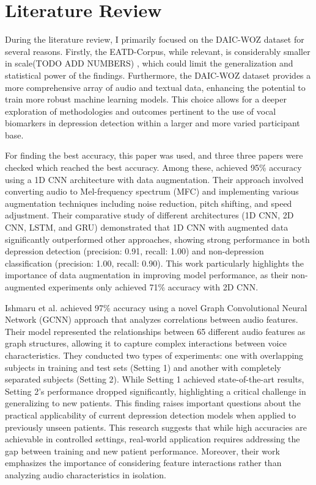 \section{Literature Review}
During the literature review, I primarily focused on the DAIC-WOZ dataset for several reasons. Firstly, the EATD-Corpus, while relevant, is considerably smaller in scale(TODO ADD NUMBERS) , which could limit the generalization and statistical power of the findings. Furthermore, the DAIC-WOZ dataset provides a more comprehensive array of audio and textual data, enhancing the potential to train more robust machine learning models. This choice allows for a deeper exploration of methodologies and outcomes pertinent to the use of vocal biomarkers in depression detection within a larger and more varied participant base.

For finding the best accuracy, this paper\cite{liu2024diagnostic} was used, and three three papers were checked which reached the best accuracy. Among these, \cite{homsiang2022classification} achieved 95\% accuracy using a 1D CNN architecture with data augmentation. Their approach involved converting audio to Mel-frequency spectrum (MFC) and implementing various augmentation techniques including noise reduction, pitch shifting, and speed adjustment. Their comparative study of different architectures (1D CNN, 2D CNN, LSTM, and GRU) demonstrated that 1D CNN with augmented data significantly outperformed other approaches, showing strong performance in both depression detection (precision: 0.91, recall: 1.00) and non-depression classification (precision: 1.00, recall: 0.90). This work particularly highlights the importance of data augmentation in improving model performance, as their non-augmented experiments only achieved 71\% accuracy with 2D CNN.

Ishmaru et al. \cite{ishimaru2023classification} achieved 97\% accuracy using a novel Graph Convolutional Neural Network (GCNN) approach that analyzes correlations between audio features. Their model represented the relationships between 65 different audio features as graph structures, allowing it to capture complex interactions between voice characteristics. They conducted two types of experiments: one with overlapping subjects in training and test sets (Setting 1) and another with completely separated subjects (Setting 2). While Setting 1 achieved state-of-the-art results, Setting 2's performance dropped significantly, highlighting a critical challenge in generalizing to new patients. This finding raises important questions about the practical applicability of current depression detection models when applied to previously unseen patients.
This research suggests that while high accuracies are achievable in controlled settings, real-world application requires addressing the gap between training and new patient performance. Moreover, their work emphasizes the importance of considering feature interactions rather than analyzing audio characteristics in isolation.

